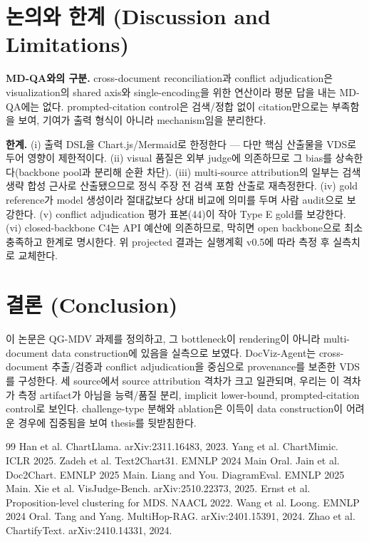 \documentclass[11pt]{article}
\begin{document}
\section{논의와 한계 (Discussion and Limitations)}

\textbf{MD-QA와의 구분.} cross-document reconciliation과 conflict adjudication은 visualization의
shared axis와 single-encoding을 위한 연산이라 평문 답을 내는 MD-QA에는 없다. prompted-citation
control은 검색/정합 없이 citation만으로는 부족함을 보여, 기여가 출력 형식이 아니라 mechanism임을
분리한다.

\textbf{한계.} (i) 출력 DSL을 Chart.js/Mermaid로 한정한다 — 다만 핵심 산출물을 VDS로 두어 영향이
제한적이다. (ii) visual 품질은 외부 judge에 의존하므로 그 bias를 상속한다(backbone pool과 분리해
순환 차단). (iii) multi-source attribution의 일부는 검색 생략 합성 근사로 산출됐으므로 정식 주장
전 검색 포함 산출로 재측정한다. (iv) gold reference가 model 생성이라 절대값보다 상대 비교에 의미를
두며 사람 audit으로 보강한다. (v) conflict adjudication 평가 표본(44)이 작아 Type E gold를
보강한다. (vi) closed-backbone C4는 API 예산에 의존하므로, 막히면 open backbone으로 최소 충족하고
한계로 명시한다. 위 projected 결과는 실행계획 v0.5에 따라 측정 후 실측치로 교체한다.

\section{결론 (Conclusion)}

이 논문은 QG-MDV 과제를 정의하고, 그 bottleneck이 rendering이 아니라 multi-document data
construction에 있음을 실측으로 보였다. DocViz-Agent는 cross-document 추출/검증과 conflict
adjudication을 중심으로 provenance를 보존한 VDS를 구성한다. 세 source에서 source attribution
격차가 크고 일관되며, 우리는 이 격차가 측정 artifact가 아님을 능력/품질 분리, implicit lower-bound,
prompted-citation control로 보인다. challenge-type 분해와 ablation은 이득이 data construction이
어려운 경우에 집중됨을 보여 thesis를 뒷받침한다.


\begin{thebibliography}{99}
 Han et al. ChartLlama. arXiv:2311.16483, 2023.
 Yang et al. ChartMimic. ICLR 2025.
 Zadeh et al. Text2Chart31. EMNLP 2024 Main Oral.
 Jain et al. Doc2Chart. EMNLP 2025 Main.
 Liang and You. DiagramEval. EMNLP 2025 Main.
 Xie et al. VisJudge-Bench. arXiv:2510.22373, 2025.
 Ernst et al. Proposition-level clustering for MDS. NAACL 2022.
 Wang et al. Loong. EMNLP 2024 Oral.
 Tang and Yang. MultiHop-RAG. arXiv:2401.15391, 2024.
 Zhao et al. ChartifyText. arXiv:2410.14331, 2024.
\end{thebibliography}
\end{document}
